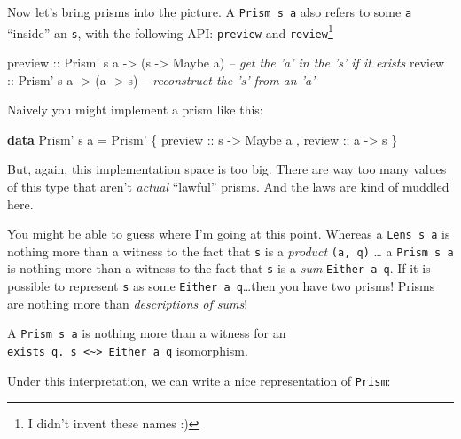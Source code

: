 \documentclass[]{article}
\newenvironment{Shaded}{}{}
\newcommand{\CommentTok}[1]{\textcolor[rgb]{0.38,0.63,0.69}{\textit{#1}}}
\newcommand{\DataTypeTok}[1]{\textcolor[rgb]{0.56,0.13,0.00}{#1}}
\newcommand{\FunctionTok}[1]{\textcolor[rgb]{0.02,0.16,0.49}{#1}}
\newcommand{\KeywordTok}[1]{\textcolor[rgb]{0.00,0.44,0.13}{\textbf{#1}}}
\newcommand{\NormalTok}[1]{#1}
\newcommand{\OtherTok}[1]{\textcolor[rgb]{0.00,0.44,0.13}{#1}}
\begin{document}
Now let's bring prisms into the picture. A
\texttt{Prism\textquotesingle{}\ s\ a} also refers to some \texttt{a} ``inside''
an \texttt{s}, with the following API: \texttt{preview} and
\texttt{review}\footnote{I didn't invent these names :)}

\begin{Shaded}
\begin{Highlighting}[]
\OtherTok{preview ::} \DataTypeTok{Prism'}\NormalTok{ s a }\OtherTok{->}\NormalTok{ (s }\OtherTok{->} \DataTypeTok{Maybe}\NormalTok{ a)   }\CommentTok{-- get the 'a' in the 's' if it exists}
\OtherTok{review  ::} \DataTypeTok{Prism'}\NormalTok{ s a }\OtherTok{->}\NormalTok{ (a }\OtherTok{->}\NormalTok{ s)         }\CommentTok{-- reconstruct the 's' from an 'a'}
\end{Highlighting}
\end{Shaded}

Naively you might implement a prism like this:

\begin{Shaded}
\begin{Highlighting}[]
\KeywordTok{data} \DataTypeTok{Prism'}\NormalTok{ s a }\FunctionTok{=} \DataTypeTok{Prism'}
\NormalTok{    \{}\OtherTok{ preview ::}\NormalTok{ s }\OtherTok{->} \DataTypeTok{Maybe}\NormalTok{ a}
\NormalTok{    ,}\OtherTok{ review  ::}\NormalTok{ a }\OtherTok{->}\NormalTok{ s}
\NormalTok{    \}}
\end{Highlighting}
\end{Shaded}

But, again, this implementation space is too big. There are way too many values
of this type that aren't \emph{actual} ``lawful'' prisms. And the laws are kind
of muddled here.

You might be able to guess where I'm going at this point. Whereas a
\texttt{Lens\textquotesingle{}\ s\ a} is nothing more than a witness to the fact
that \texttt{s} is a \emph{product} \texttt{(a,\ q)} \ldots{} a
\texttt{Prism\textquotesingle{}\ s\ a} is nothing more than a witness to the
fact that \texttt{s} is a \emph{sum} \texttt{Either\ a\ q}. If it is possible to
represent \texttt{s} as some \texttt{Either\ a\ q}\ldots{}then you have two
prisms! Prisms are nothing more than \emph{descriptions of sums}!

A \texttt{Prism\textquotesingle{}\ s\ a} is nothing more than a witness for an
\texttt{exists\ q.\ s\ \textless{}\textasciitilde{}\textgreater{}\ Either\ a\ q}
isomorphism.

Under this interpretation, we can write a nice representation of
\texttt{Prism\textquotesingle{}}:
\end{document}
